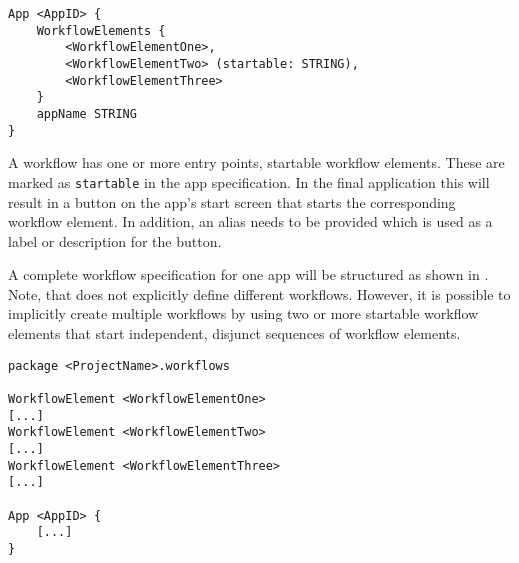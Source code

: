 \begin{lstlisting}[language=MD2, label=lst:app, caption=App definition in \MD]
App <AppID> {
	WorkflowElements {
		<WorkflowElementOne>,
		<WorkflowElementTwo> (startable: STRING),
		<WorkflowElementThree> 
	}
	appName STRING
}
\end{lstlisting}

A workflow has one or more entry points, \ie startable workflow elements. These are marked as {\lstinline!startable!} in the app specification.
In the final application this will result in a button on the app's start screen that starts the corresponding workflow element. In addition, an alias needs to be provided which is used as a label or description for the button.

A complete workflow specification for one app will be structured as shown in . Note, that \MD does not explicitly define different workflows. However, it is possible to implicitly create multiple workflows by using two or more startable workflow elements that start independent, disjunct sequences of workflow elements.

\begin{lstlisting}[language=MD2, label=lst:workflow, caption=Workflow definition in \MD]
package <ProjectName>.workflows

WorkflowElement <WorkflowElementOne>
[...]
WorkflowElement <WorkflowElementTwo>
[...]
WorkflowElement <WorkflowElementThree>
[...]

App <AppID> {
	[...]
}
\end{lstlisting}